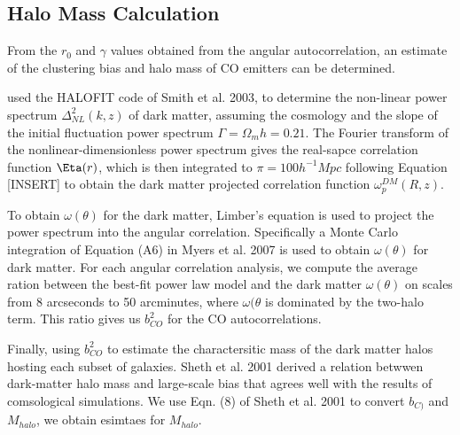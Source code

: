 \subsection{Halo Mass Calculation}

From the $r_0$ and $\gamma$ values obtained from the angular autocorrelation, an estimate of the clustering bias and halo mass of CO emitters can be determined.

\cite{hickox2011clustering} used the HALOFIT code of Smith et al. 2003, to determine the non-linear power spectrum $\Delta_{NL}^2(k,z)$ of dark matter, assuming the cosmology and the slope of the initial fluctuation power spectrum $\Gamma = \Omega_mh = 0.21$. The Fourier transform of the nonlinear-dimensionless power spectrum gives the real-sapce correlation function $\Eta(r)$, which is then integrated to $\pi = 100 h^{-1} Mpc$ following Equation [INSERT] to obtain the dark matter projected correlation function $\omega^{DM}_p(R,z)$.

To obtain $\omega(\theta)$ for the dark matter, Limber's equation is used to project the power spectrum into the angular correlation. Specifically a Monte Carlo integration of Equation (A6) in Myers et al. 2007 is used to obtain $\omega(\theta)$ for dark matter. For each angular correlation analysis, we compute the average ration between the best-fit power law model and the dark matter $\omega(\theta)$ on scales from 8 arcseconds to 50 arcminutes, where $\omega(\theta$ is dominated by the two-halo term. This ratio gives us $b^2_{CO}$ for the CO autocorrelations. 

Finally, using $b^2_{CO}$ to estimate the charactersitic mass of the dark matter halos hosting each subset of galaxies. Sheth et al. 2001 derived a relation betwwen dark-matter halo mass and large-scale bias that agrees well with the results of comsological simulations. We use Eqn. (8) of Sheth et al. 2001 to convert $b_{C)}$ and $M_{halo}$, we obtain esimtaes for $M_{halo}$. 